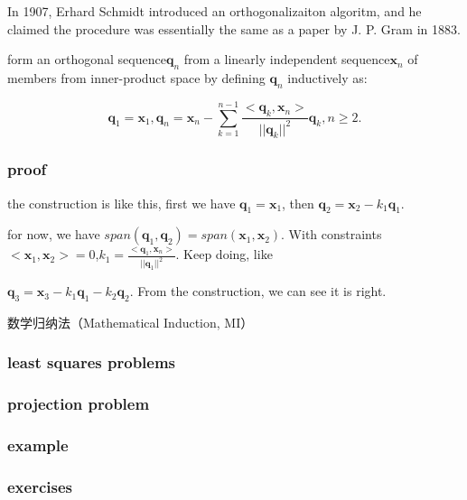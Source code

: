 \documentclass[UTF8]{../../09-Mathematics}
\begin{document}
In 1907, Erhard Schmidt introduced an orthogonalizaiton algoritm, and he claimed the procedure was essentially the same as a paper by J. P. Gram in 1883.

form an orthogonal sequence${\boldsymbol{q}_n}$ from  a linearly independent sequence${\boldsymbol{x}_n}$ of members from inner-product space by defining ${\boldsymbol{q}_n}$ inductively as:

$$
\boldsymbol{q}_1 = \boldsymbol{x}_1,
\boldsymbol{q}_n = \boldsymbol{x}_n - \sum_{k=1}^{n-1}\frac{<\boldsymbol{q}_k,\boldsymbol{x}_n>}{||\boldsymbol{q}_k||^2}\boldsymbol {q}_k, n\geqslant2.
$$


\subsubsection{proof}

the construction is like this, first we have 
$\boldsymbol{q}_1 = \boldsymbol{x}_1$, then $\boldsymbol{q}_2 = \boldsymbol{x}_2 - k_1 \boldsymbol{q}_1$.

for now, we have 
$span(\boldsymbol{q}_1,\boldsymbol{q}_2) =span(\boldsymbol{x}_1,\boldsymbol{x}_2) $. With constraints $<\boldsymbol{x}_1,\boldsymbol{x}_2>=0$,$k_1 = \frac{<\boldsymbol{q}_1,\boldsymbol{x}_n>}{||\boldsymbol{q}_1||^2}$. Keep doing, like 

$\boldsymbol{q}_3 = \boldsymbol{x}_3 - k_1 \boldsymbol{q}_1- k_2 \boldsymbol{q}_2$. From the construction, we can see it is right.


数学归纳法（Mathematical Induction, MI）


\subsubsection{least squares problems}

\subsubsection{projection problem}

\subsubsection{example}

\subsubsection{exercises}
\end{document}
